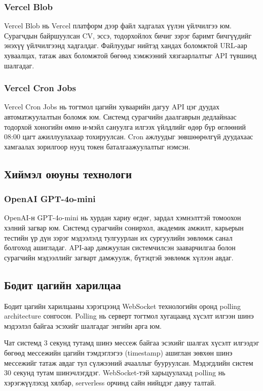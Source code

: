 \subsubsection{Vercel Blob}

Vercel Blob нь Vercel платформ дээр файл хадгалах үүлэн үйлчилгээ юм.
Сурагчдын байршуулсан CV, эссэ, тодорхойлох бичиг зэрэг баримт бичгүүдийг
энэхүү үйлчилгээнд хадгалдаг. Файлуудыг нийтэд хандах боломжтой URL-аар
хуваалцах, татаж авах боломжтой бөгөөд хэмжээний хязгаарлалтыг API
түвшинд шалгадаг.

\subsubsection{Vercel Cron Jobs}

Vercel Cron Jobs нь тогтмол цагийн хуваарийн дагуу API цэг дуудах
автоматжуулалтын боломж юм. Системд сурагчийн даалгаврын дедлайнаас
тодорхой хоногийн өмнө и-мэйл сануулга илгээх үйлдлийг өдөр бүр өглөөний
08:00 цагт ажиллуулахаар тохируулсан. Cron ажлуудыг зөвшөөрөлгүй дуудахаас
хамгаалах зорилгоор нууц токен баталгаажуулалтыг нэмсэн.

\subsection{Хиймэл оюуны технологи}

\subsubsection{OpenAI GPT-4o-mini}

OpenAI-н GPT-4o-mini нь хурдан хариу өгдөг, зардал хэмнэлттэй томоохон
хэлний загвар юм. Системд сурагчийн сонирхол, академик амжилт, карьерын
тестийн үр дүн зэрэг мэдээлэлд тулгуурлан их сургуулийн зөвлөмж санал
болгоход ашигладаг. API-аар дамжуулан системчилсэн зааварчилгаа болон
сурагчийн мэдээллийг загварт дамжуулж, бүтэцтэй зөвлөмж хүлээн авдаг.

\subsection{Бодит цагийн харилцаа}

Бодит цагийн харилцааны хэрэгцээнд WebSocket технологийн оронд polling
architecture сонгосон. Polling нь серверт тогтмол хугацаанд хүсэлт
илгээн шинэ мэдээлэл байгаа эсэхийг шалгадаг энгийн арга юм.

Чат системд 3 секунд тутамд шинэ мессеж байгаа эсэхийг шалгах хүсэлт
илгээдэг бөгөөд мессежийн цагийн тэмдэглэгээ (timestamp) ашиглан зөвхөн
шинэ мессежийг татаж авдаг тул сүлжээний ачааллыг бууруулсан. Мэдэгдлийн
систем 30 секунд тутам шинэчлэгддэг. WebSocket-тэй харьцуулахад polling нь
хэрэгжүүлэхэд хялбар, serverless орчинд сайн нийцдэг давуу талтай.

